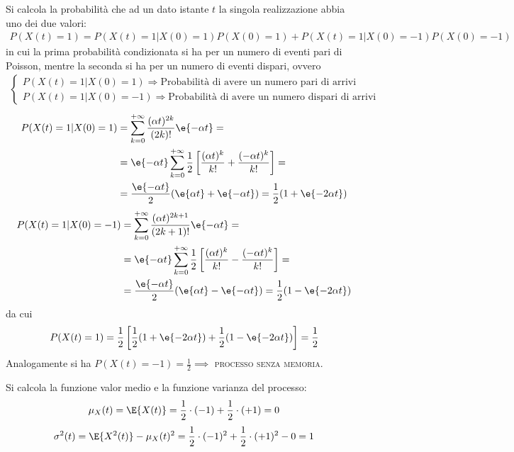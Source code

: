 Si calcola la probabilità che ad un dato istante $t$ la singola realizzazione abbia uno dei due valori:
\begin{gather*}
	P(X(t)=1)=P(X(t)=1|X(0)=1)P(X(0)=1)+P(X(t)=1|X(0)=-1)P(X(0)=-1)
\end{gather*}
in cui la prima probabilità condizionata si ha per un numero di eventi pari di Poisson, mentre la seconda si ha per un numero di eventi dispari, ovvero
\begin{gather*}
\begin{cases}
	P(X(t)=1|X(0)=1) \Rightarrow \text{Probabilità di avere un numero pari di arrivi} \\
	P(X(t)=1|X(0)=-1) \Rightarrow \text{Probabilità di avere un numero dispari di arrivi}
\end{cases}
\end{gather*}
\begin{equation}
\begin{split}
	P(X(t)=1|X(0)=1)&=\sum_{k=0}^{+\infty}{\frac{(\alpha t)^{2k}}{(2k)!}\e{-\alpha t}}=\\
	&=\e{-\alpha t}\sum_{k=0}^{+\infty}{\frac{1}{2}\left[\frac{(\alpha t)^k}{k!}+\frac{(-\alpha t)^k}{k!}\right]}=\\
	&=\frac{\e{-\alpha t}}{2}(\e{\alpha t}+\e{-\alpha t})=\frac{1}{2}(1+\e{-2\alpha t})
\end{split}
\end{equation}
\begin{equation}
\begin{split}
	P(X(t)=1|X(0)=-1)&=\sum_{k=0}^{+\infty}{\frac{(\alpha t)^{2k+1}}{(2k+1)!}\e{-\alpha t}}=\\
	&=\e{-\alpha t}\sum_{k=0}^{+\infty}{\frac{1}{2}\left[\frac{(\alpha t)^k}{k!}-\frac{(-\alpha t)^k}{k!}\right]}=\\
	&=\frac{\e{-\alpha t}}{2}(\e{\alpha t}-\e{-\alpha t})=\frac{1}{2}(1-\e{-2\alpha t})
\end{split}
\end{equation}
da cui
\begin{equation}
	P(X(t)=1)=\frac{1}{2}\left[\frac{1}{2}(1+\e{-2\alpha t})+\frac{1}{2}(1-\e{-2\alpha t})\right]=\frac{1}{2}
\end{equation}
Analogamente si ha $P(X(t)=-1)=\frac{1}{2} \implies$ \textsc{processo senza memoria}.

Si calcola la funzione valor medio e la funzione varianza del processo:
\begin{equation}
	\mu_X(t)=\E{X(t)}=\frac{1}{2}\cdot(-1)+\frac{1}{2}\cdot(+1)=0
\end{equation}
\begin{equation}
	\sigma^2(t)=\E{X^2(t)}-\mu_X(t)^{2}=\frac{1}{2}\cdot(-1)^2+\frac{1}{2}\cdot(+1)^2-0=1
\end{equation}


